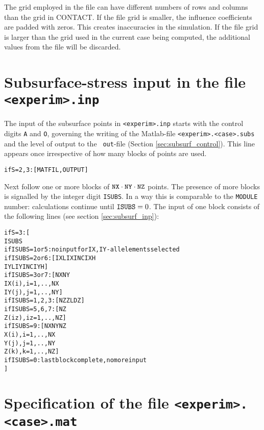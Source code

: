 \documentclass[12pt]{report}
\begin{document}
The grid employed in the file can have different numbers of rows and
columns than the grid in CONTACT. If the file grid is smaller, the
influence coefficients are padded with zeros. This creates inaccuracies in
the simulation. If the file grid is larger than the grid used in the
current case being computed, the additional values from the file will be
discarded.

\section{Subsurface-stress input in the file {\tt <experim>.inp}}
\label{sec:spec_subsinp}

The input of the subsurface points in {\tt <experim>.inp} starts with the
control digits {\tt A} and {\tt O}, governing the writing of the
Matlab-file {\tt <experim>.<case>.subs} and the level of output to the {\tt
out}-file (Section \ref{sec:subsurf_control}). This line appears once
irrespective of how many blocks of points are used.
\begin{alltt}\small
    if S=2,3: [ MATFIL, OUTPUT ]
\end{alltt}
Next follow one or more blocks of ${\tt NX}\cdot{\tt NY}\cdot{\tt NZ}$
points. The presence of more blocks is signalled by the integer
digit {\tt ISUBS}. In a way this is comparable to the {\tt MODULE} number:
calculations continue until ${\tt ISUBS}=0$. The input of one block
consists of the following lines (see section \ref{sec:subsurf_inp}):
\begin{alltt}\small
    if S=3: [ 
       ISUBS
       if ISUBS=1 or 5:   no input for IX,IY - all elements selected
       if ISUBS=2 or 6: [ IXL IXINC IXH  
                          IYL IYINC IYH      ]
       if ISUBS=3 or 7: [ NX  NY
                          IX(i), i=1,..,NX
                          IY(j), j=1,..,NY   ]
       if ISUBS=1,2,3:  [ NZ  ZL  DZ         ]
       if ISUBS=5,6,7:  [ NZ
                          Z(iz), iz=1,..,NZ  ]
       if ISUBS=9:      [ NX  NY  NZ
                          X(i),  i=1,..,NX
                          Y(j),  j=1,..,NY
                          Z(k),  k=1,..,NZ   ]
       if ISUBS=0:      last block complete, no more input
    ]
\end{alltt}

\section{Specification of the file {\tt <experim>.<case>.mat}}
\label{sec:spec_mat}
\end{document}

